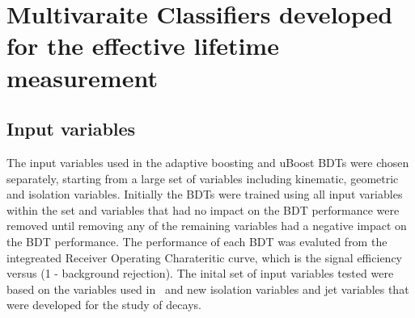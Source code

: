 \chapter{Multivaraite Classifiers developed for the effective lifetime measurement}
\label{sec:appendix2}


\section{Input variables}





The input variables used in the adaptive boosting and uBoost BDTs were chosen separately, starting from a large set of variables including kinematic, geometric and isolation variables. Initially the BDTs were trained using all input variables within the set and variables that had no impact on the BDT performance were removed until removing any of the remaining variables had a negative impact on the BDT performance. The performance of each BDT was evaluted from the integreated Receiver Operating Charateritic curve, which is the signal efficiency versus (1 - background rejection). The inital set of input variables tested were based on the variables used in~\cite{} and new isolation variables and jet variables that were developed for the study of \bmumu decays. 


